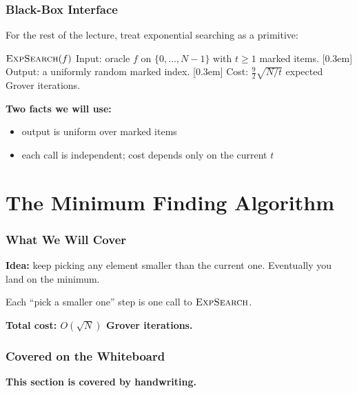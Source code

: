 \documentclass[xcolor=table]{beamer}
\theoremstyle{remark}
\theoremstyle{plain}
\def\\{ }%
\begin{document}
\begin{frame}
  \frametitle{Black-Box Interface}
  For the rest of the lecture, treat exponential searching as a primitive:

  \vspace{0.4cm}
  \begin{block}{$\textsc{ExpSearch}(f)$}
    Input: oracle $f$ on $\{0,\dots,N-1\}$ with $t \ge 1$ marked items.\\[0.3em]
    Output: a uniformly random marked index.\\[0.3em]
    Cost: $\tfrac{9}{2}\sqrt{N/t}$ expected Grover iterations.
  \end{block}

  \vspace{0.5cm}
  \textbf{Two facts we will use:}
  \begin{itemize}
    \item output is uniform over marked items
    \item each call is independent; cost depends only on the current $t$
  \end{itemize}
\end{frame}

\section{The Minimum Finding Algorithm}

\begin{frame}
  \frametitle{What We Will Cover}
  \textbf{Idea:} keep picking any element smaller than the current one.
  Eventually you land on the minimum.

  \vspace{0.6cm}
  Each ``pick a smaller one'' step is one call to $\textsc{ExpSearch}$.

  \vspace{0.6cm}
  \textbf{Total cost: $O(\sqrt{N})$ Grover iterations.}
\end{frame}

\begin{frame}
  \frametitle{Covered on the Whiteboard}
  \vspace{1.5cm}
  \begin{center}
    {\Large \textbf{This section is covered by handwriting.}}
  \end{center}
\end{frame}

\end{document}
